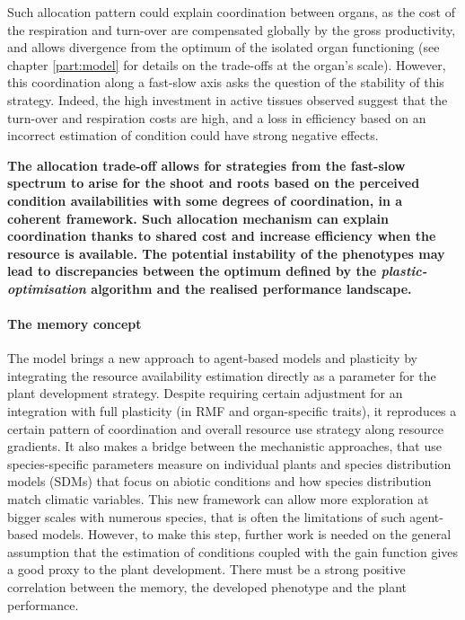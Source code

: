 Such allocation pattern could explain coordination between organs, as the cost of the respiration and turn-over are compensated globally by the gross productivity, and allows divergence from the optimum of the isolated organ functioning (see chapter \ref{part:model} for details on the trade-offs at the organ's scale). However, this coordination along a fast-slow axis asks the question of the stability of this strategy. Indeed, the high investment in active tissues observed suggest that the turn-over and respiration costs are high, and a loss in efficiency based on an incorrect estimation of condition could have strong negative effects. 



\textbf{The allocation trade-off allows for strategies from the fast-slow spectrum to arise for the shoot and roots based on the perceived condition availabilities with some degrees of coordination, in a coherent framework. Such allocation mechanism can explain coordination thanks to shared cost and increase efficiency when the resource is available. The potential instability of the phenotypes may lead to discrepancies between the optimum defined by the \textit{plastic-optimisation} algorithm and the realised performance landscape. }

\paragraph{The memory concept}

The model \model brings a new approach to agent-based models and plasticity by integrating the resource availability estimation directly as a parameter for the plant development strategy. Despite requiring certain adjustment for an integration with full plasticity (in RMF and organ-specific traits), it reproduces a certain pattern of coordination and overall resource use strategy along resource gradients. It also makes a bridge between the mechanistic approaches, that use species-specific parameters measure on individual plants and species distribution models (SDMs) that focus on abiotic conditions  and how species distribution match climatic variables. This new framework can allow more exploration at bigger scales with numerous species, that is often the limitations of such agent-based models. However, to make this step, further work is needed on the general assumption that the estimation of conditions coupled with the gain function gives a good proxy to the plant development. There must be a strong positive correlation between the memory, the developed phenotype and the plant performance. 

